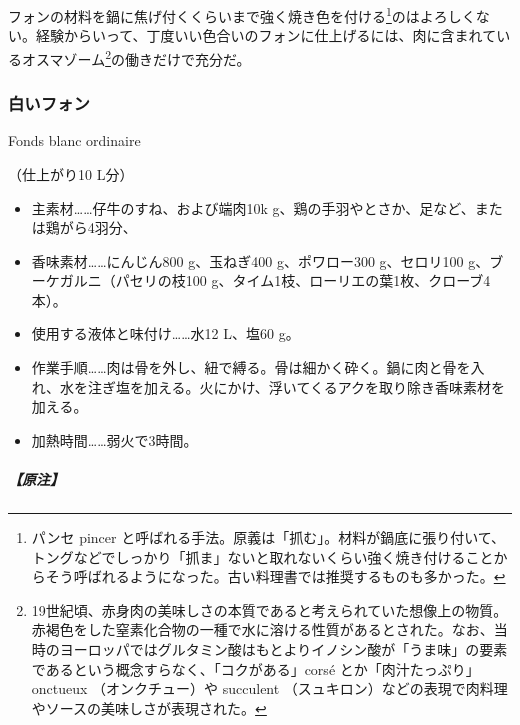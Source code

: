 \begin{recette}
フォンの材料を鍋に焦げ付くくらいまで強く焼き色を付ける\footnote{パンセ
  pincer
  と呼ばれる手法。原義は「抓む」。材料が鍋底に張り付いて、トングなどでしっかり「抓ま」ないと取れないくらい強く焼き付けることからそう呼ばれるようになった。古い料理書では推奨するものも多かった。}のはよろしくない。経験からいって、丁度いい色合いのフォンに仕上げるには、肉に含まれているオスマゾーム\footnote{19世紀頃、赤身肉の美味しさの本質であると考えられていた想像上の物質。赤褐色をした窒素化合物の一種で水に溶ける性質があるとされた。なお、当時のヨーロッパではグルタミン酸はもとよりイノシン酸が「うま味」の要素であるという概念すらなく、「コクがある」corsé
  とか「肉汁たっぷり」onctueux （オンクチュー）や succulent
  （スュキロン）などの表現で肉料理やソースの美味しさが表現された。}の働きだけで充分だ。

\atoaki{}

\hypertarget{fonds-blanc-ordinaire}{%
\subsubsection{白いフォン}\label{fonds-blanc-ordinaire}}

\begin{frsubenv}

Fonds blanc ordinaire

\end{frsubenv}

 

（仕上がり10 L分）

\begin{itemize}
\item
  主素材\ldots{}\ldots{}仔牛のすね、および端肉10k
  g、鶏の手羽やとさか、足など、または鶏がら4羽分、
\item
  香味素材\ldots{}\ldots{}にんじん800 g、玉ねぎ400 g、ポワロー300
  g、セロリ100 g、ブーケガルニ（パセリの枝100
  g、タイム1枝、ローリエの葉1枚、クローブ4本）。
\item
  使用する液体と味付け\ldots{}\ldots{}水12 L、塩60 g。
\item
  作業手順\ldots{}\ldots{}肉は骨を外し、紐で縛る。骨は細かく砕く。鍋に肉と骨を入れ、水を注ぎ塩を加える。火にかけ、浮いてくるアクを取り除き香味素材を加える。
\item
  加熱時間\ldots{}\ldots{}弱火で3時間。
\end{itemize}

\hypertarget{nota-fonds-blanc-ordinaire}{%
\subparagraph{【原注】}\label{nota-fonds-blanc-ordinaire}}


\end{recette}
